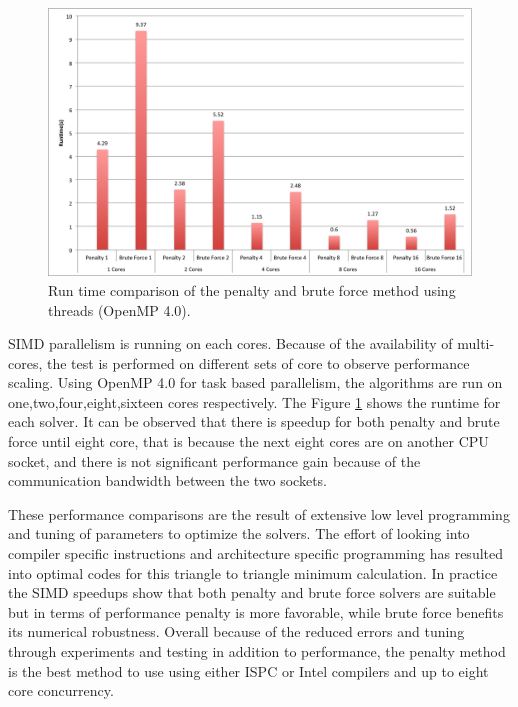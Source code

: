 \documentclass[times,12pt]{ACME2015article}
\begin{document}
\begin{figure}[!h]
\centering
\includegraphics[width=1\textwidth]{openmp} \protect\caption{\label{fig18}Run time comparison of the penalty and brute force method using threads (OpenMP 4.0).}
\end{figure}

SIMD parallelism is running on each cores. Because of the availability of multi-cores, the test is performed on different sets of core to observe performance scaling. Using OpenMP 4.0 for task based parallelism, the algorithms are run on one,two,four,eight,sixteen cores respectively. The Figure \ref{fig18} shows the runtime for each solver. It can be observed that there is speedup for both penalty and brute force until eight core, that is because the next eight cores are on another CPU socket, and there is not significant performance gain because of the communication bandwidth between the two sockets.

These performance comparisons are the result of extensive low level programming and tuning of parameters to optimize the solvers. The effort of looking into compiler specific instructions and architecture specific programming has resulted into optimal codes for this triangle to triangle minimum calculation. In practice the SIMD speedups show that both penalty and brute force solvers are suitable but in terms of performance penalty is more favorable, while brute force benefits its numerical robustness. Overall because of the reduced errors and tuning through experiments and testing in addition to performance, the penalty method is the best method to use using either ISPC or Intel compilers and up to eight core concurrency.


\clearpage
\end{document}
